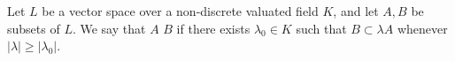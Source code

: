 Let $L$ be a vector space over a non-discrete valuated field $K$, and let $A, B$ be subsets of $L$. We say that $A$  $B$ if there exists $\lambda_0 \in K$ such that $B \subset \lambda A$ whenever $|\lambda| \geq |\lambda_0|$.
